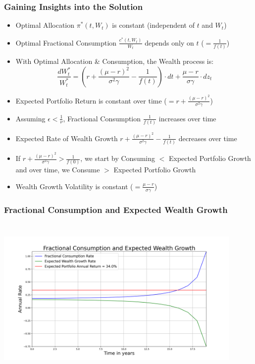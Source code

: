\documentclass[handout]{beamer}
\begin{document}
\begin{frame}
\frametitle{Gaining Insights into the Solution}
\pause
\begin{itemize}[<+->]
\item Optimal Allocation $\pi^*(t, W_t)$ is constant (independent of $t$ and $W_t$)
\item Optimal Fractional Consumption $\frac {c^*(t, W_t)} {W_t}$ depends only on $t$ ($=\frac 1 {f(t)}$)
\item With Optimal Allocation \& Consumption, the Wealth process is:
$$\frac {dW_t^*} {W_t^*} = (r + \frac {(\mu - r)^2} {\sigma^2 \gamma} - \frac 1 {f(t)}) \cdot dt + \frac {\mu - r} {\sigma \gamma} \cdot dz_t$$
\item Expected Portfolio Return is constant over time ($=r + \frac {(\mu - r)^2} {\sigma^2 \gamma}$)
\item Assuming $\epsilon < \frac 1 {\nu}$, Fractional Consumption $\frac 1 {f(t)}$ increases over time
\item Expected Rate of Wealth Growth $r + \frac {(\mu - r)^2} {\sigma^2 \gamma} - \frac 1 {f(t)}$ decreases over time
\item If $r + \frac {(\mu - r)^2} {\sigma^2 \gamma} > \frac 1 {f(0)}$, we start by Consuming $<$ Expected Portfolio Growth and over time, we Consume $>$ Expected Portfolio Growth
\item Wealth Growth Volatility is constant ($= \frac {\mu - r} {\sigma \gamma}$)
\end{itemize}
\end{frame}

\begin{frame}
\frametitle{Fractional Consumption and Expected Wealth Growth}
\includegraphics[width=12cm, height=8cm]{portfolio_growth.png}
\end{frame}
\end{document}

